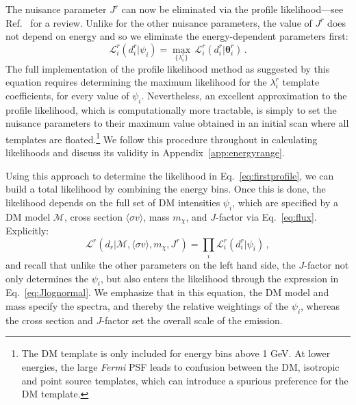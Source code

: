 The nuisance parameter $J^r$ can now be eliminated via the profile likelihood---see Ref.~\cite{Rolke:2004mj} for a review. Unlike for the other nuisance parameters, the value of $J^r$ does not depend on energy and so we eliminate the energy-dependent parameters first:
\begin{equation}
\mathcal{L}_i^r(d_i^r | \psi_i) = \max_{\{\lambda_i^r\}}\,\mathcal{L}_i^r \left( d_i^r | \boldsymbol{\theta}_i^r \right)\,.
\label{eq:firstprofile}
\end{equation}
The full implementation of the profile likelihood method as suggested by this equation requires determining the maximum likelihood for the $\lambda_i^r$ template coefficients, for every value of $\psi_i$.  Nevertheless, an excellent approximation to the profile likelihood, which is computationally more tractable, is simply to set the nuisance parameters to their maximum value obtained in an initial scan where all templates are floated.\footnote{The DM template is only included for energy bins above 1 GeV.  At lower energies, the large \textit{Fermi} PSF leads to confusion between the DM, isotropic and point source templates, which can introduce a spurious preference for the DM template.} 
 We follow this procedure throughout in calculating likelihoods and discuss its validity in Appendix~\ref{app:energyrange}. 

Using this approach to determine the likelihood in Eq.~\ref{eq:firstprofile}, we can build a total likelihood by combining the energy bins. Once this is done, the likelihood  depends on the full set of DM intensities $\psi_i$, which are specified by a DM model $\mathcal{M}$, cross section $\langle \sigma v \rangle$, mass $m_{\chi}$, and $J$-factor via Eq.~\ref{eq:flux}. Explicitly:
\begin{equation}
\mathcal{L}^r(d_r | \mathcal{M}, \langle \sigma v \rangle, m_\chi, J^r) = \prod_i \mathcal{L}_i^r(d_i^r | \psi_i)\,,
\end{equation}
and recall that unlike the other parameters on the left hand side, the $J$-factor not only determines the $\psi_i$, but also enters the likelihood through the expression in Eq.~\ref{eq:Jlognormal}. We emphasize that in this equation, the DM model and mass specify the spectra, and thereby the relative weightings of the $\psi_i$, whereas the cross section and $J$-factor set the overall scale of the emission.


